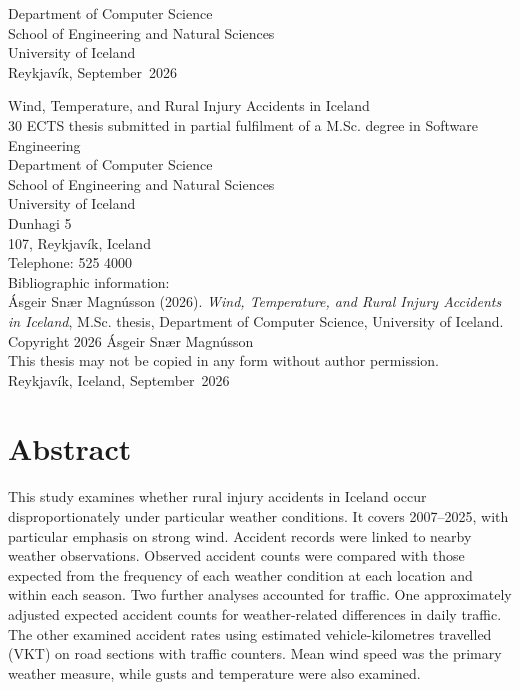 \documentclass[a4paper,12pt,oneside,open=any,numbers=noenddot]{scrbook}
\def\thesisyear{2026}
\def\thesismonth{September}
\def\thesisauthor{Ásgeir Snær Magnússon}
\def\thesistitle{Wind, Temperature, and\\ Rural Injury Accidents in Iceland}
\def\thesiscredits{30}
\def\thesissubject{Software Engineering}
\def\thesiskind{M.Sc.}
\def\thesisschool{School of Engineering and Natural Sciences}
\def\thesisfaculty{Department of Computer Science}
\def\thesisaddress{Dunhagi 5}
\def\thesispostalcode{107}
\def\thesistelephone{525 4000}
\def\thesislicense{This thesis may not be copied in any form without author permission.}
\newcommand{\removelinebreaks}[1]{%
  \begingroup\def\\{}#1\endgroup}
\begin{document}
\begin{titlepage}
\begin{center}
    \thesisfaculty{} \\
    \thesisschool{} \\
    University of Iceland \\
    Reykjavík, \thesismonth{}~\thesisyear{}
  \end{center}

  \newpage
  \thispagestyle{empty}
  \vspace*{\fill}
  \sffamily\removelinebreaks{\thesistitle{}} \\

  \thesiscredits{} ECTS thesis submitted in partial fulfilment of a
  \thesiskind{} degree in \thesissubject{} \\

  \thesisfaculty{} \\
  \thesisschool{} \\
  University of Iceland \\
  \thesisaddress{} \\
  \thesispostalcode{}, Reykjavík, Iceland \\
  Telephone: \thesistelephone{} \\

  Bibliographic information: \\
  \thesisauthor{} (\thesisyear{}). \emph{\removelinebreaks{\thesistitle{}}},
  \thesiskind{} thesis, \thesisfaculty{}, University of Iceland.\\

  Copyright \textcopyright{} \thesisyear{} \thesisauthor{} \\
  \thesislicense{} \\
  Reykjavík, Iceland, \thesismonth{}~\thesisyear{}
\end{titlepage}

\clearpage
{}
\setcounter{page}{1}

\section*{Abstract}
This study examines whether rural injury accidents in Iceland occur disproportionately under particular weather conditions. It covers 2007--2025, with particular emphasis on strong wind. Accident records were linked to nearby weather observations. Observed accident counts were compared with those expected from the frequency of each weather condition at each location and within each season. Two further analyses accounted for traffic. One approximately adjusted expected accident counts for weather-related differences in daily traffic. The other examined accident rates using estimated vehicle-kilometres travelled (VKT) on road sections with traffic counters. Mean wind speed was the primary weather measure, while gusts and temperature were also examined.
\end{document}
